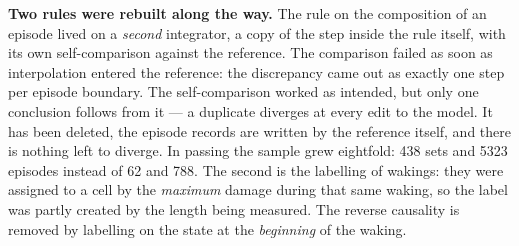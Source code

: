 \textbf{Two rules were rebuilt along the way.} The rule on the composition of an episode lived on a \emph{second} integrator, a copy of the step inside the rule itself, with its own self-comparison against the reference. The comparison failed as soon as interpolation entered the reference: the discrepancy came out as exactly one step per episode boundary. The self-comparison worked as intended, but only one conclusion follows from it --- a duplicate diverges at every edit to the model. It has been deleted, the episode records are written by the reference itself, and there is nothing left to diverge. In passing the sample grew eightfold: 438 sets and 5323 episodes instead of 62 and 788. The second is the labelling of wakings: they were assigned to a cell by the \emph{maximum} damage during that same waking, so the label was partly created by the length being measured. The reverse causality is removed by labelling on the state at the \emph{beginning} of the waking.
